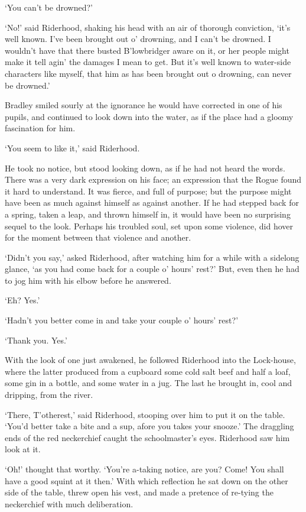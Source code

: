 ‘You can’t be drowned?’

‘No!’ said Riderhood, shaking his head with an air of thorough
conviction, ‘it’s well known. I’ve been brought out o’ drowning, and I
can’t be drowned. I wouldn’t have that there busted B’lowbridger aware
on it, or her people might make it tell agin’ the damages I mean to get.
But it’s well known to water-side characters like myself, that him as
has been brought out o drowning, can never be drowned.’

Bradley smiled sourly at the ignorance he would have corrected in one of
his pupils, and continued to look down into the water, as if the place
had a gloomy fascination for him.

‘You seem to like it,’ said Riderhood.

He took no notice, but stood looking down, as if he had not heard the
words. There was a very dark expression on his face; an expression
that the Rogue found it hard to understand. It was fierce, and full
of purpose; but the purpose might have been as much against himself as
against another. If he had stepped back for a spring, taken a leap, and
thrown himself in, it would have been no surprising sequel to the look.
Perhaps his troubled soul, set upon some violence, did hover for the
moment between that violence and another.

‘Didn’t you say,’ asked Riderhood, after watching him for a while with
a sidelong glance, ‘as you had come back for a couple o’ hours’ rest?’
But, even then he had to jog him with his elbow before he answered.

‘Eh? Yes.’

‘Hadn’t you better come in and take your couple o’ hours’ rest?’

‘Thank you. Yes.’

With the look of one just awakened, he followed Riderhood into the
Lock-house, where the latter produced from a cupboard some cold salt
beef and half a loaf, some gin in a bottle, and some water in a jug. The
last he brought in, cool and dripping, from the river.

‘There, T’otherest,’ said Riderhood, stooping over him to put it on
the table. ‘You’d better take a bite and a sup, afore you takes
your snooze.’ The draggling ends of the red neckerchief caught the
schoolmaster’s eyes. Riderhood saw him look at it.

‘Oh!’ thought that worthy. ‘You’re a-taking notice, are you? Come! You
shall have a good squint at it then.’ With which reflection he sat down
on the other side of the table, threw open his vest, and made a pretence
of re-tying the neckerchief with much deliberation.

